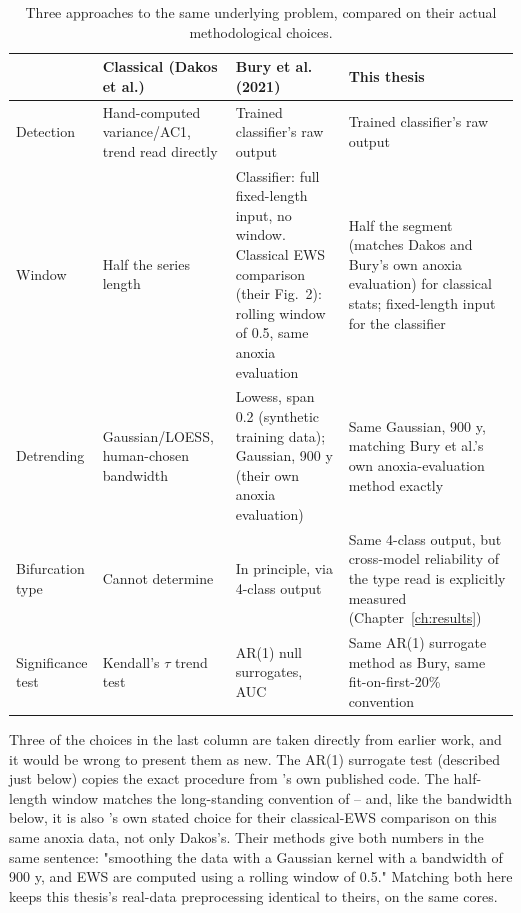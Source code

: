 \begin{table}[htbp]
\centering
\caption{Three approaches to the same underlying problem, compared on their actual methodological choices.}
\label{tab:methodology_comparison}
\begin{tabular}{p{2.6cm}p{3.6cm}p{3.6cm}p{3.6cm}}
\toprule
 & \textbf{Classical (Dakos et al.)} & \textbf{Bury et al. (2021)} & \textbf{This thesis} \\
\midrule
Detection & Hand-computed variance/AC1, trend read directly & Trained classifier's raw output & Trained classifier's raw output \\
Window & Half the series length & Classifier: full fixed-length input, no window. Classical EWS comparison (their Fig.\ 2): rolling window of 0.5, same anoxia evaluation & Half the segment (matches Dakos and Bury's own anoxia evaluation) for classical stats; fixed-length input for the classifier \\
Detrending & Gaussian/LOESS, human-chosen bandwidth & Lowess, span 0.2 (synthetic training data); Gaussian, 900 y (their own anoxia evaluation) & Same Gaussian, 900 y, matching Bury et al.'s own anoxia-evaluation method exactly \\
Bifurcation type & Cannot determine & In principle, via 4-class output & Same 4-class output, but cross-model reliability of the type read is explicitly measured (Chapter~\ref{ch:results}) \\
Significance test & Kendall's $\tau$ trend test & AR(1) null surrogates, AUC & Same AR(1) surrogate method as Bury, same fit-on-first-20\% convention \\
\bottomrule
\end{tabular}
\end{table}

Three of the choices in the last column are taken directly from earlier work, and it would be wrong to present them as new. The AR(1) surrogate test (described just below) copies the exact procedure from \citet{bury2021}'s own published code. The half-length window matches the long-standing convention of \citet{dakos2012} -- and, like the bandwidth below, it is also \citet{bury2021}'s own stated choice for their classical-EWS comparison on this same anoxia data, not only Dakos's. Their methods give both numbers in the same sentence: "smoothing the data with a Gaussian kernel with a bandwidth of 900 y, and EWS are computed using a rolling window of 0.5." Matching both here keeps this thesis's real-data preprocessing identical to theirs, on the same cores.


